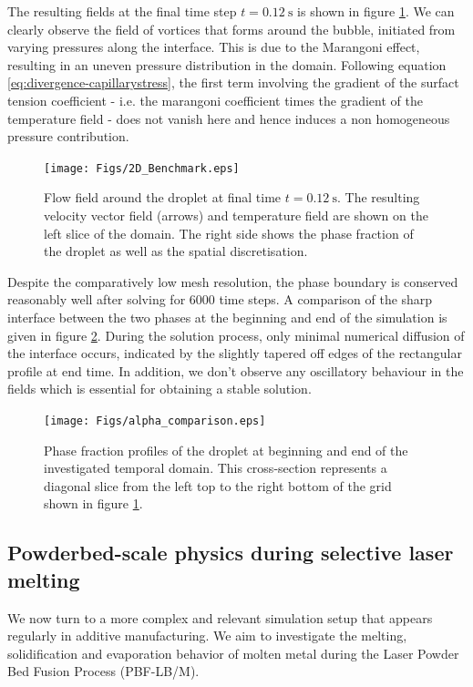 \documentclass[conference,final]{IEEEtran}
\begin{document}
The resulting fields at the final time step $t = \SI{0.12}{\second}$ is shown in figure \ref{fig:2d-benchmark}. We can clearly observe the field of vortices that forms around the bubble, initiated from varying pressures along the interface. This is due to the Marangoni effect, resulting in an uneven pressure distribution in the domain. Following equation \ref{eq:divergence-capillarystress}, the first term involving the gradient of the surfact tension coefficient - i.e. the marangoni coefficient times the gradient of the temperature field - does not vanish here and hence induces a non homogeneous pressure contribution.

\begin{figure}[!tbp]
  \centering
  \texttt{[image: Figs/2D\_Benchmark.eps]}
  \caption{Flow field around the droplet at final time $t = \SI{0.12}{\second}$. The resulting velocity vector field (arrows) and temperature field are shown on the left slice of the domain. The right side shows the phase fraction of the droplet as well as the spatial discretisation.}
  \label{fig:2d-benchmark}
\end{figure}

Despite the comparatively low mesh resolution, the phase boundary is conserved reasonably well after solving for 6000 time steps. A comparison of the sharp interface between the two phases at the beginning and end of the simulation is given in figure \ref{fig:alpha-comparison}. During the solution process, only minimal numerical diffusion of the interface occurs, indicated by the slightly tapered off edges of the rectangular profile at end time. In addition, we don't observe any oscillatory behaviour in the fields which is essential for obtaining a stable solution.

\begin{figure}[!tbp]
  \centering
  \texttt{[image: Figs/alpha\_comparison.eps]}
  \caption{Phase fraction profiles of the droplet at beginning and end of the investigated temporal domain. This cross-section represents a diagonal slice from the left top to the right bottom of the grid shown in figure \ref{fig:2d-benchmark}.}
  \label{fig:alpha-comparison}
\end{figure}

\subsection{Powderbed-scale physics during selective laser melting}

We now turn to a more complex and relevant simulation setup that appears regularly in additive manufacturing. We aim to investigate the melting, solidification and evaporation behavior of molten metal during the Laser Powder Bed Fusion Process (PBF-LB/M).
\end{document}
